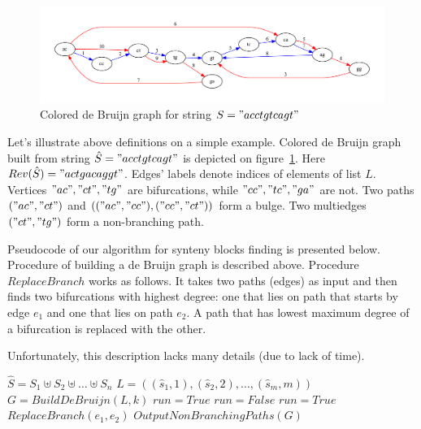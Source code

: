 \documentclass[a4paper, 12pt]{scrartcl}
\begin{document}
\begin{figure}
	\includegraphics[scale = 0.50]{graph3.pdf}
	\small \caption{Colored de Bruijn graph for string \(S = "acctgtcagt" \) }
	\label{ColoredDeBruijn}
\end{figure}

Let's illustrate above definitions on a simple example. Colored de Bruijn graph built from string \(\hat{S} = "acctgtcagt"\)
is depicted on figure~\ref{ColoredDeBruijn}. Here \(Rev(\hat{S}) = "actgacaggt"\). Edges' labels denote indices of elements of
list \(L\). Vertices \("ac", "ct", "tg"\) are bifurcations, while \("cc", "tc", "ga"\) are not. Two paths \(("ac", "ct")\) and \((("ac", "cc"), ("cc", "ct"))\)
form a bulge. Two multiedges \(("ct", "tg")\) form a non-branching path.

Pseudocode of our algorithm for synteny blocks finding is presented below. Procedure of building a de Bruijn graph is described above. Procedure
\(ReplaceBranch\) works as follows. It takes two paths (edges) as input and then finds two bifurcations with highest degree: one that lies on path that starts
by edge \(e_1\) and one that lies on path \(e_2\). A path that has lowest maximum degree of a bifurcation is replaced with the other.

Unfortunately, this description lacks many details (due to lack of time).

\begin{algorithm}[H]               
\small \caption*{\(SyntenyFinder(S = \lbrace S_{1}, S_{2}, \ldots, S_{n} \rbrace,  k, \delta)\)} 
\label{Pseudocode}
\begin{algorithmic}[1]     
\State \(\hat{S} = S_{1} \uplus S_{2} \uplus \ldots \uplus S_{n} \)
\State \(L = ((\hat{s}_1, 1), (\hat{s}_2, 2), \ldots, (\hat{s}_{m}, m))\)
\State \(G = BuildDeBruijn(L, k)\)
\State \(run = True\)
	\State \(run = False\)
				\State \(run = True\)
				\State \(ReplaceBranch(e_1, e_2)\)
			\EndIf
		\EndFor
	\EndFor
\EndWhile
\State \(OutputNonBranchingPaths(G)\)
\end{algorithmic}
\end{algorithm}
\end{document}
